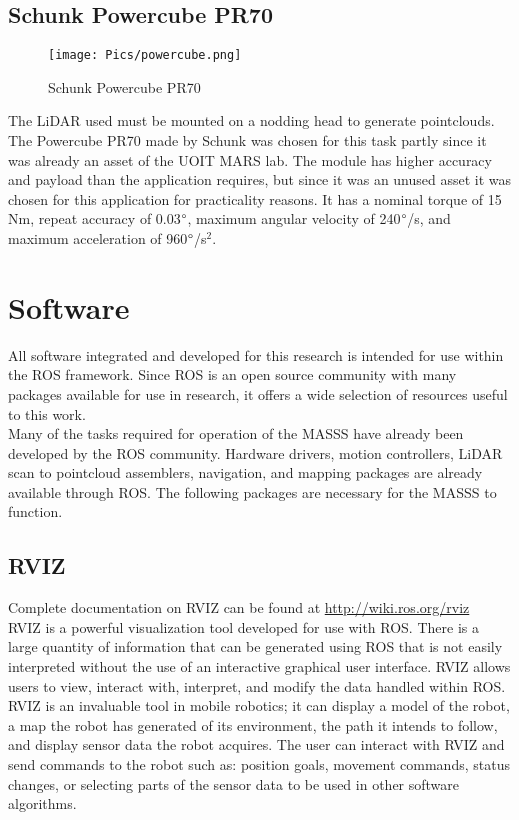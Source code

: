 \subsection{Schunk Powercube PR70}
\begin{figure}[H]
    \centering
    \texttt{[image: Pics/powercube.png]}
    \caption{Schunk Powercube PR70 \cite{schunkpage}}
    \label{fig:schunk}
\end{figure}
The LiDAR used must be mounted on a nodding head to generate pointclouds. The Powercube PR70 made by Schunk was chosen for this task partly since it was already an asset of the UOIT MARS lab. The module has higher accuracy and payload than the application requires, but since it was an unused asset it was chosen for this application for practicality reasons. It has a nominal torque of 15 Nm, repeat accuracy of 0.03$\degree$, maximum angular velocity of 240$\degree$/s, and maximum acceleration of 960$\degree$/s$^2$. \\
\section{Software}
\label{sec:software}
All software integrated and developed for this research is intended for use within the ROS framework. Since ROS is an open source community with many packages available for use in research, it offers a wide selection of resources useful to this work.\\

Many of the tasks required for operation of the MASSS have already been developed by the ROS community. Hardware drivers, motion controllers, LiDAR scan to pointcloud assemblers, navigation, and mapping packages are already available through ROS. The following packages are necessary for the MASSS to function.\\
\subsection{RVIZ}
\label{sec:rviz}

Complete documentation on RVIZ can be found at \url{http://wiki.ros.org/rviz}\\

RVIZ is a powerful visualization tool developed for use with ROS. There is a large quantity of information that can be generated using ROS that is not easily interpreted without the use of an interactive graphical user interface. RVIZ allows users to view, interact with, interpret, and modify the data handled within ROS. RVIZ is an invaluable tool in mobile robotics; it can display a model of the robot, a map the robot has generated of its environment, the path it intends to follow, and display sensor data the robot acquires. The user can interact with RVIZ and send commands to the robot such as: position goals, movement commands, status changes, or selecting parts of the sensor data to be used in other software algorithms.\\

